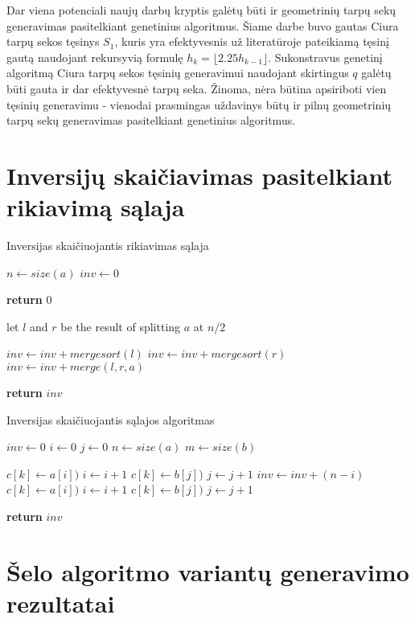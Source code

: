 \documentclass{VUMIFInfKursinis}
\begin{document}
Dar viena potenciali naujų darbų kryptis galėtų būti ir geometrinių tarpų sekų generavimas pasitelkiant genetinius algoritmus.
Šiame darbe buvo gautas Ciura tarpų sekos tęsinys $S_1$, kuris yra efektyvesnis už literatūroje pateikiamą tęsinį gautą naudojant rekursyvią formulę $h_{k}=\lfloor 2.25h_{k-1}\rfloor$.
Sukonstravus genetinį algoritmą Ciura tarpų sekos tęsinių generavimui naudojant skirtingus $q$ galėtų būti gauta ir dar efektyvesnė tarpų seka.
Žinoma, nėra būtina apsiriboti vien tęsinių generavimu - vienodai prasmingas uždavinys būtų ir pilnų geometrinių tarpų sekų generavimas pasitelkiant genetinius algoritmus.

\printbibliography[heading=bibintoc] %

\appendix  %

\section{Inversijų skaičiavimas pasitelkiant rikiavimą sąlaja}

\begin{algorithm}[H]
  \caption{Inversijas skaičiuojantis rikiavimas sąlaja}\label{alg:merge_sort}
  \begin{algorithmic}[1]
      \State $n \gets size(a)$
      \State $inv \gets 0$
      
        \State \textbf{return} $0$ 
      \EndIf

      \State let $l$ and $r$ be the result of splitting $a$ at $n/2$

      \State $inv \gets inv + mergesort(l)$
      \State $inv \gets inv + mergesort(r)$
      \State $inv \gets inv + merge(l,r,a)$

      \State \textbf{return} $inv$ 

    \EndProcedure
  \end{algorithmic}
\end{algorithm}

\begin{algorithm}[H]
  \caption{Inversijas skaičiuojantis sąlajos algoritmas}\label{alg:merge}
  \begin{algorithmic}[1]
      \State $inv \gets 0$
      \State $i \gets 0$
      \State $j \gets 0$
      \State $n \gets size(a)$
      \State $m \gets size(b)$
      
              \State $c[k] \gets a[i])$
              \State $i \gets i+1$
            \Else
              \State $c[k] \gets b[j])$
              \State $j \gets j+1$
              \State $inv \gets inv + (n-i)$
            \EndIf
          \Else
            \State $c[k] \gets a[i])$
            \State $i \gets i+1$
          \EndIf
        \Else
          \State $c[k] \gets b[j])$
          \State $j \gets j+1$
        \EndIf
      \EndFor

      \State \textbf{return} $inv$
      
    \EndProcedure
  \end{algorithmic}
\end{algorithm}

\section{Šelo algoritmo variantų generavimo rezultatai}
\end{document}
